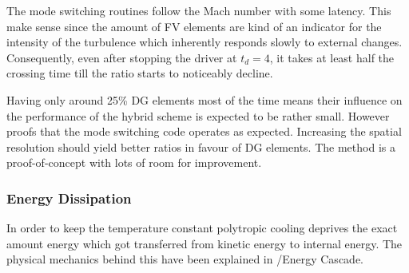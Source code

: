 The mode switching routines follow the Mach number with some latency. This make
sense since the amount of FV elements are kind of an indicator for the
intensity of the turbulence which inherently responds slowly to external
changes. Consequently, even after stopping the driver at $t_d = 4$, it takes at
least half the crossing time till the ratio starts to noticeably decline.

Having only around 25\% DG elements most of the time means their influence on
the performance of the hybrid scheme is expected to be rather small.  However
 proofs that the mode switching
code operates as expected. Increasing the spatial resolution should yield
better ratios in favour of DG elements. The method is a proof-of-concept with
lots of room for improvement.


\newpage

\subsubsection{Energy Dissipation}
\label{sec:stirturb-energy-dissipation}
In order to keep the temperature constant polytropic cooling deprives the exact
amount energy which got transferred from kinetic energy to internal energy. The
physical mechanics behind this have been explained in /Energy
Cascade.

